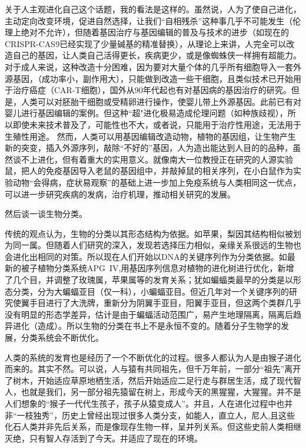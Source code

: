 \documentclass[UTF8]{ctexart}
\begin{document}
关于人主观进化自己这个话题，我的看法是这样的。虽然说，人为了使自己进化，主动定向改变环境，促进自然选择，让我们“自相残杀”这种事几乎不可能发生（伦理上绝对不允许），但随着基因治疗与基因编辑的普及与技术的进步（如现在的CRISPR-CAS9已经实现了少量碱基的精准替换），从理论上来讲，人完全可以改造自己的基因，让人类自己活得更长，疾病更少，或是像蜘蛛侠一样拥有超能力。对于成人来说，这种改造十分困难，因为要对大量个体的几乎所有细胞导入一套外源基因，（成功率小，副作用大），只能做到改造一些干细胞，且类似技术已开始用于治疗癌症（CAR-T细胞），国外从90年代起也有对基因病的基因治疗的研究。但是，人类可以对胚胎干细胞或受精卵进行操作，使婴儿带上外源基因。此前已有对婴儿进行基因编辑的案例。但这种“超"进化极易造成伦理问题（如种族歧视），所以即使未来技术普及了，可能性也不大，或者说，只能用于治疗性用途，无法用于生殖性用途。 然而，人类可以用基因编辑改造动物，植物的基因组，让生物产生新的突变，插入外源序列，敲除“不好的”基因，人为造出能达到人目的的品种，虽然谈不上进化，但有着重大的实用意义。就像南大一位教授正在研究的人源实验鼠，把人的免疫基因导入老鼠的基因组中，并敲掉鼠的相关序列，在小白鼠作为实验动物“会得病，症状易观察”的基础上进一步加上免疫系统与人类相同这一优点，可以进一步研究疾病的发病，治疗机理，推动相关研究的发展。\par
然后谈一谈生物分类。\par
传统的观点认为，生物的分类以其形态结构为依据。如苹果，梨因其结构相似被划为同一属。但随着人们研究的深入，发现若选择压力相似，亲缘关系很远的生物也会进化出相同的对策。所以现在人们开始以DNA的关键序列作为分类依据。如最新的被子植物分类系统APG\ IV,用基因序列信息对植物的进化树进行优化，新增了几个目，并调整了玫瑰属，苹果属等的发育关系；犹如蝙蝠类最早的分类是以形态分类，分为大蝙蝠亚目（仅一科），小蝙蝠亚目。但近几年对一个关键序列的研究使翼手目进行了大洗牌，重新分为阴翼手亚目，阳翼手亚目，但这两个类群几乎没有明显的形态学差异，估计是由于蝙蝠活动范围广，易产生地理隔离，隔离后趋异进化（造成）。所以生物的分类在书上不是永恒不变的。随着分子生物学的发展，分类系统会不断优化。\par
人类的系统的发育也是经历了一个不断优化的过程。很多人都认为人是由猴子进化而来的。其实不然。可以说，人与猿有共同祖先，但千万年前，一部分“祖先”离开了树木，开始适应草原地栖生活，然后开始适应二足行走与群居生活，成了现代智人，也就是我们，另一部分祖先猿留在树上，形成今天的黑猩猩，大猩猩。并不是人们想象的“猴子一代代生孩子，孩子从猿变成人”。并且，人在进化过程中也并非“一枝独秀”，历史上曾经出现过很多人类分支，如能人，直立人，尼人,且这些化石人类并非先后关系，而是像现存生物一样，呈并列关系。但这些史前人类相继灭绝，只有智人存活到了今天。并适应了现在的环境。\par
\end{document}
